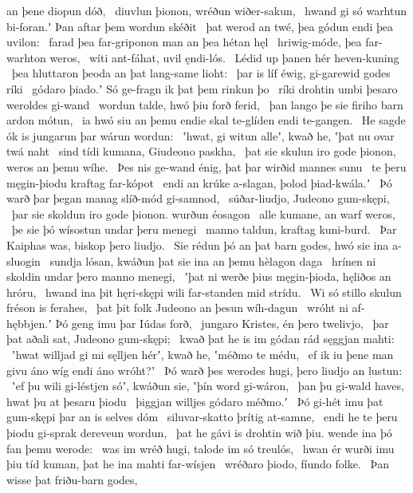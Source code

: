 an þene diopun dóð, \hld\ diuvlun þionon,
wréðun wiðer-sakun, \hld\ hwand gi só warhtun bi-foran.ʼ
Þan aftar þem wordun skéðit \hld\ þat werod an twé,
þea gódun endi þea uvilon: \hld\ farad þea far-griponon man
an þea hétan hęl \hld\ hriwig-móde,
þea far-warhton weros, \hld\ wíti ant-fáhat,
uvil ęndi-lós. \hld\ Lédid up þanen
hér heven-kuning \hld\ þea hluttaron þeoda
an þat lang-same lioht: \hld\ þar is líf éwig,
gi-garewid godes ríki \hld\ gódaro þiado.ʼ
Só ge-fragn ik þat þem rinkun þo \hld\ ríki drohtin
umbi þesaro weroldes gi-wand \hld\ wordun talde,
hwó þiu forð ferid, \hld\ þan lango þe sie firiho barn
ardon mótun, \hld\ ia hwó siu an þemu endie skal
te-glíden endi te-gangen. \hld\ He sagde ók is jungarun þar
wárun wordun: \hld\ ʽhwat, gi witun alleʼ, kwað he,
ʽþat nu ovar twá naht \hld\ sind tídi kumana,
Giudeono paskha, \hld\ þat sie skulun iro gode þionon,
weros an þemu wíhe. \hld\ Þes nis ge-wand énig,
þat þar wirðid mannes sunu \hld\ te þeru męgin-þiodu
kraftag far-kópot \hld\ endi an krúke a-slagan,
þolod þiad-kwála.ʼ \hld\ Þó warð þar þegan manag
slíð-mód gi-samnod, \hld\ súðar-liudjo,
Judeono gum-skępi, \hld\ þar sie skoldun iro gode þionon.
wurðun éosagon \hld\ alle kumane,
an warf weros, \hld\ þe sie þó wísostun
undar þeru menegi \hld\ manno taldun,
kraftag kuni-burd. \hld\ Þar Kaiphas was,
biskop þero liudjo. \hld\ Sie rédun þó an þat barn godes,
hwó sie ina a-sluogin \hld\ sundja lósan,
kwáðun þat sie ina an þemu hèlagon daga \hld\ hrínen ni skoldin
undar þero manno menegi, \hld\ ʽþat ni werðe þius męgin-þioda,
hęliðos an hróru, \hld\ hwand ina þit hęri-skępi wili
far-standen mid strídu. \hld\ Wi só stillo skulun
fréson is ferahes, \hld\ þat þit folk Judeono
an þesun wíh-dagun \hld\ wróht ni af-hębbjen.ʼ
Þó geng imu þar Iúdas forð, \hld\ jungaro Kristes,
én þero twelivjo, \hld\ þar þat aðali sat,
Judeono gum-skępi; \hld\ kwað þat he is im gódan rád
sęggjan mahti: \hld\ ʽhwat willjad gi mi sęlljen hérʼ, kwað he,
ʽméðmo te médu, \hld\ ef ik iu þene man givu
áno wíg endi áno wróht?ʼ \hld\ Þó warð þes werodes hugi,
þero liudjo an lustun: \hld\ ʽef þu wili gi-léstjen sóʼ, kwáðun sie,
ʽþín word gi-wáron, \hld\ þan þu gi-wald haves,
hwat þu at þesaru þiodu \hld\ þiggjan willjes
gódaro méðmo.ʼ \hld\ Þó gi-hét imu þat gum-skępi þar
an is selves dóm \hld\ siluvar-skatto
þrítig at-samne, \hld\ endi he te þeru þiodu gi-sprak
dereveun wordun, \hld\ þat he gávi is drohtin wið þiu.
wende ina þó fan þemu werode: \hld\ was im wréð hugi,
talode im só treulós, \hld\ hwan ér wurði imu þiu tíd kuman,
þat he ina mahti far-wísjen \hld\ wréðaro þiodo,
fíundo folke. \hld\ Þan wisse þat friðu-barn godes,

